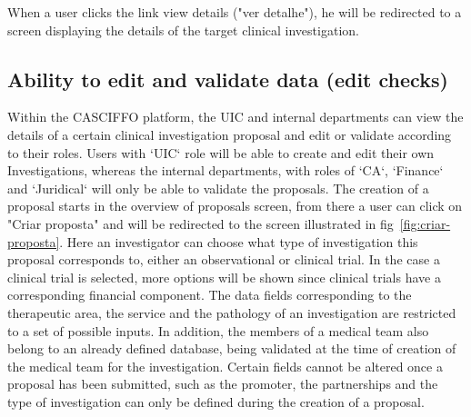 When a user clicks the link view details ("ver detalhe"), he will be redirected to a screen displaying the details of the target clinical investigation.

\subsection{Ability to edit and validate data (edit checks)}
\label{subsec:abilitiy-to-edit}
Within the CASCIFFO platform, the UIC and internal departments can view the details of a certain clinical investigation proposal and edit or validate according to their roles.
Users with `UIC` role will be able to create and edit their own Investigations, whereas the internal departments, with roles of `CA`, `Finance` and `Juridical` will only be able to validate the proposals.  
The creation of a proposal starts in the overview of proposals screen, from there a user can click on "Criar proposta" and will be redirected to the screen illustrated in fig~\ref{fig:criar-proposta}. Here an investigator can choose what type of investigation this proposal corresponds to, either an observational or clinical trial. In the case a clinical trial is selected, more options will be shown since clinical trials have a corresponding financial component.
The data fields corresponding to the therapeutic area, the service and the pathology of an investigation are restricted to a set of possible inputs. In addition, the members of a medical team also belong to an already defined database, being validated at the time of creation of the medical team for the investigation.  
Certain fields cannot be altered once a proposal has been submitted, such as the promoter, the partnerships and the type of investigation can only be defined during the creation of a proposal.  


